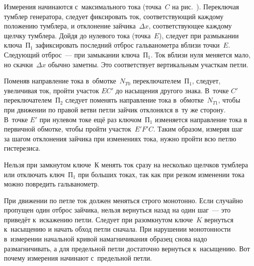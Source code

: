 Измерения начинаются с~максимального тока (точка~$C$ на рис.~). Переключая тумблер генератора,
следует фиксировать ток, соответствующий каждому положению тумблера, и отклонение зайчика~$\Delta x$, соответствующее
каждому щелчку тумблера. Дойдя до нулевого тока
(точка~$E$), следует при размыкании ключа~$\text{П}_1$ зафиксировать последний отброс гальванометра вблизи точки~$E$. Следующий
отброс~--- при замыкании ключа~$\text{П}_1$. Ток вблизи нуля меняется мало, но скачки~$\Delta x$ обычно заметны. Это соответствует
вертикальным участкам петли.

Поменяв направление тока в~обмотке~$N_{T0}$ переключателем~$\text{П}_1$, следует, увеличивая ток, пройти участок $EC'$ до
насыщения другого знака. В~точке $C'$ переключателем~$\text{П}_2$ следует поменять направление тока в~обмотке~$N_{T1}$, чтобы при
движении по правой ветви петли зайчик отклонялся в~ту же сторону. В~точке $E'$ при нулевом токе ещё раз ключом~$\text{П}_1$
изменяется направление тока в первичной обмотке, чтобы пройти участок~$E'F'C$. Таким образом, измеряя шаг за шагом
отклонения зайчика при изменениях тока, нужно пройти всю петлю гистерезиса.

Нельзя при замкнутом ключе~К менять ток сразу на несколько щелчков тумблера или отключать ключ~$\text{П}_1$ при больших
токах, так как при резком изменении тока можно повредить гальванометр.

При движении по петле ток должен меняться строго монотонно. Если случайно пропущен один отброс зайчика, нельзя вернуться
назад на один шаг~--- это приведёт к~искажению петли. Следует при разомкнутом ключе~$K$ вернуться к~насыщению и начать
обход петли сначала. При нарушении монотонности в~измерении начальной кривой намагничивания образец снова надо
размагничивать, а для предельной петли достаточно вернуться к~насыщению. Вот почему измерения начинают с~предельной
петли.


